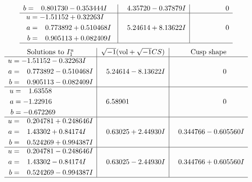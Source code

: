 \documentclass[1p]{elsarticle_modified}
\theoremstyle{definition}
\newcommand{\I}{\sqrt{-1}}
\begin{document}
$$\begin{array}{c|c|c}
\begin{aligned}
b &= \phantom{-}0.801730 - 0.353444 I\end{aligned}
 & \phantom{-}4.35720 - 0.37879 I & \phantom{-0.000000 } 0 \\ \hline\begin{aligned}
u &= -1.51152 + 0.32263 I \\
a &= \phantom{-}0.773892 + 0.510468 I \\
b &= \phantom{-}0.905113 + 0.082409 I\end{aligned}
 & \phantom{-}5.24614 + 8.13622 I & \phantom{-0.000000 } 0\\
 \hline 
 \end{array}$$\newpage$$\begin{array}{c|c|c}  
\text{Solutions to }I^u_{1}& \I (\text{vol} + \sqrt{-1}CS) & \text{Cusp shape}\\
 \hline 
\begin{aligned}
u &= -1.51152 - 0.32263 I \\
a &= \phantom{-}0.773892 - 0.510468 I \\
b &= \phantom{-}0.905113 - 0.082409 I\end{aligned}
 & \phantom{-}5.24614 - 8.13622 I & \phantom{-0.000000 } 0 \\ \hline\begin{aligned}
u &= \phantom{-}1.63558\phantom{ +0.000000I} \\
a &= -1.22916\phantom{ +0.000000I} \\
b &= -0.672269\phantom{ +0.000000I}\end{aligned}
 & \phantom{-}6.58901\phantom{ +0.000000I} & \phantom{-0.000000 } 0 \\ \hline\begin{aligned}
u &= \phantom{-}0.204781 + 0.248646 I \\
a &= \phantom{-}1.43302 + 0.84174 I \\
b &= \phantom{-}0.524269 + 0.994387 I\end{aligned}
 & \phantom{-}0.63025 + 2.44930 I & \phantom{-}0.344766 - 0.605560 I \\ \hline\begin{aligned}
u &= \phantom{-}0.204781 - 0.248646 I \\
a &= \phantom{-}1.43302 - 0.84174 I \\
b &= \phantom{-}0.524269 - 0.994387 I\end{aligned}
 & \phantom{-}0.63025 - 2.44930 I & \phantom{-}0.344766 + 0.605560 I\\
 \hline 
 \end{array}$$\newpage\newpage\renewcommand{\arraystretch}{1}
\end{document}
